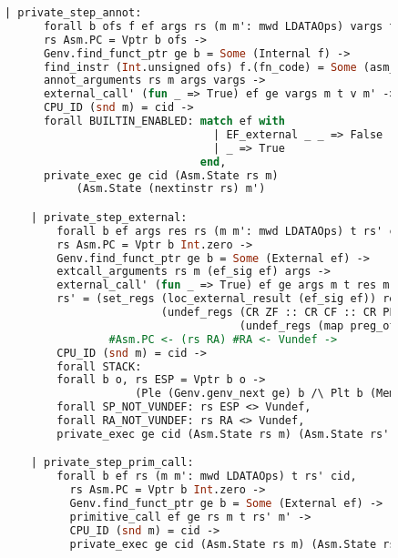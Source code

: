 \begin{figure}

\begin{lstlisting}[language=Caml]
  | private_step_annot:
      forall b ofs f ef args rs (m m': mwd LDATAOps) vargs t v cid,
      rs Asm.PC = Vptr b ofs ->
      Genv.find_funct_ptr ge b = Some (Internal f) ->
      find_instr (Int.unsigned ofs) f.(fn_code) = Some (asm_instruction (Pannot ef args)) ->
      annot_arguments rs m args vargs ->
      external_call' (fun _ => True) ef ge vargs m t v m' ->
      CPU_ID (snd m) = cid ->
      forall BUILTIN_ENABLED: match ef with
                                | EF_external _ _ => False
                                | _ => True
                              end,
      private_exec ge cid (Asm.State rs m)
           (Asm.State (nextinstr rs) m')

    | private_step_external:
        forall b ef args res rs (m m': mwd LDATAOps) t rs' cid,
        rs Asm.PC = Vptr b Int.zero ->
        Genv.find_funct_ptr ge b = Some (External ef) ->
        extcall_arguments rs m (ef_sig ef) args ->
        external_call' (fun _ => True) ef ge args m t res m' ->
        rs' = (set_regs (loc_external_result (ef_sig ef)) res 
                        (undef_regs (CR ZF :: CR CF :: CR PF :: CR SF :: CR OF :: nil) 
                                    (undef_regs (map preg_of destroyed_at_call) rs))) 
                #Asm.PC <- (rs RA) #RA <- Vundef ->
        CPU_ID (snd m) = cid ->
        forall STACK:
        forall b o, rs ESP = Vptr b o ->
                    (Ple (Genv.genv_next ge) b /\ Plt b (Mem.nextblock m)),
        forall SP_NOT_VUNDEF: rs ESP <> Vundef,
        forall RA_NOT_VUNDEF: rs RA <> Vundef,
        private_exec ge cid (Asm.State rs m) (Asm.State rs' m')

    | private_step_prim_call:
        forall b ef rs (m m': mwd LDATAOps) t rs' cid,
          rs Asm.PC = Vptr b Int.zero ->
          Genv.find_funct_ptr ge b = Some (External ef) ->
          primitive_call ef ge rs m t rs' m' ->
          CPU_ID (snd m) = cid ->
          private_exec ge cid (Asm.State rs m) (Asm.State rs' m').
\end{lstlisting}
\end{figure}

